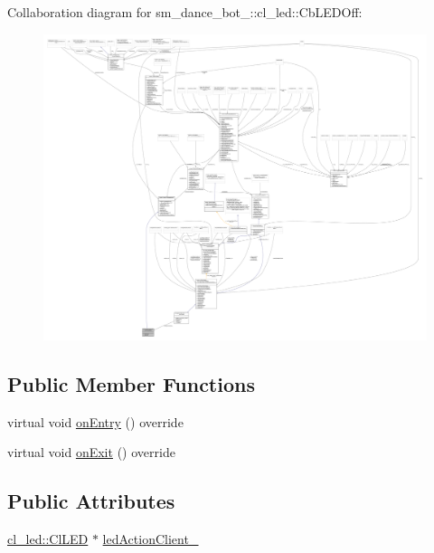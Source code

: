 Collaboration diagram for sm\+\_\+dance\+\_\+bot\+\_\+:\+:cl\+\_\+led\+:\+:Cb\+L\+E\+D\+Off\+:
\nopagebreak
\begin{figure}[H]
\begin{center}
\leavevmode
\includegraphics[width=350pt]{classsm__dance__bot__2_1_1cl__led_1_1CbLEDOff__coll__graph}
\end{center}
\end{figure}
\subsection*{Public Member Functions}
\begin{DoxyCompactItemize}
\item 
virtual void \hyperlink{classsm__dance__bot__2_1_1cl__led_1_1CbLEDOff_a101b78da1cfd4dcbec6fc607c956bd14}{on\+Entry} () override
\item 
virtual void \hyperlink{classsm__dance__bot__2_1_1cl__led_1_1CbLEDOff_a6ca7b3ba30347c4be33d3b4946009325}{on\+Exit} () override
\end{DoxyCompactItemize}
\subsection*{Public Attributes}
\begin{DoxyCompactItemize}
\item 
\hyperlink{classsm__dance__bot__2_1_1cl__led_1_1ClLED}{cl\+\_\+led\+::\+Cl\+L\+ED} $\ast$ \hyperlink{classsm__dance__bot__2_1_1cl__led_1_1CbLEDOff_a569146280ebdd71aa5b8f3268eb028bc}{led\+Action\+Client\+\_\+}
\end{DoxyCompactItemize}


